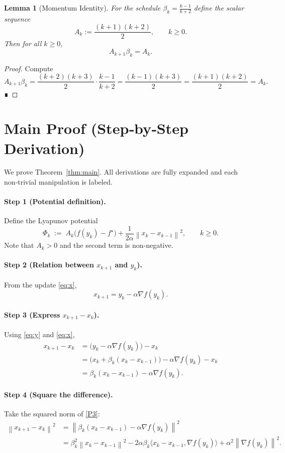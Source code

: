 \documentclass{article}
\newtheorem{lemma}{Lemma}
\newcommand{\norm}[1]{\left\lVert #1\right\rVert}
\begin{document}
\begin{lemma}[Momentum Identity]\label{lem:beta}
For the schedule $\beta_k=\frac{k-1}{k+2}$ define the scalar sequence
\[
A_k:=\frac{(k+1)(k+2)}{2},\qquad k\ge0.
\]
Then for all $k\ge0$,
\[
A_{k+1}\beta_k = A_k . \tag{L2}
\]
\end{lemma}
\begin{proof}
Compute
\[
A_{k+1}\beta_k
= \frac{(k+2)(k+3)}{2}\cdot\frac{k-1}{k+2}
= \frac{(k-1)(k+3)}{2}
= \frac{(k+1)(k+2)}{2}=A_k .
\]
∎
\end{proof}

\section*{Main Proof (Step‑by‑Step Derivation)}
We prove Theorem~\ref{thm:main}.  
All derivations are fully expanded and each non‑trivial manipulation is labeled.

\paragraph{Step 1 (Potential definition).}  
Define the Lyapunov potential
\[
\Phi_k \;:=\; A_k\bigl(f(y_k)-f^\star\bigr)+\frac{1}{2\alpha}\norm{x_k-x_{k-1}}^{2},\qquad k\ge0 .
\tag{P1}
\]
Note that $A_k>0$ and the second term is non‑negative.

\paragraph{Step 2 (Relation between $x_{k+1}$ and $y_k$).}  
From the update \eqref{eq:x},
\[
x_{k+1}=y_k-\alpha\nabla f(y_k).
\tag{P2}
\]

\paragraph{Step 3 (Express $x_{k+1}-x_k$).}  
Using \eqref{eq:y} and \eqref{eq:x},
\[
\begin{aligned}
x_{k+1}-x_k
&= \bigl(y_k-\alpha\nabla f(y_k)\bigr)-x_k \\
&= \bigl(x_k+\beta_k(x_k-x_{k-1})\bigr)-\alpha\nabla f(y_k)-x_k \\
&= \beta_k (x_k-x_{k-1})-\alpha\nabla f(y_k).
\end{aligned}
\tag{P3}
\]

\paragraph{Step 4 (Square the difference).}  
Take the squared norm of \eqref{P3}:
\[
\begin{aligned}
\norm{x_{k+1}-x_k}^{2}
&= \norm{\beta_k (x_k-x_{k-1})-\alpha\nabla f(y_k)}^{2}\\
&= \beta_k^{2}\norm{x_k-x_{k-1}}^{2}
   -2\alpha\beta_k\langle x_k-x_{k-1},\nabla f(y_k)\rangle
   +\alpha^{2}\norm{\nabla f(y_k)}^{2}.
\end{aligned}
\tag{P4}
\]
\end{document}

